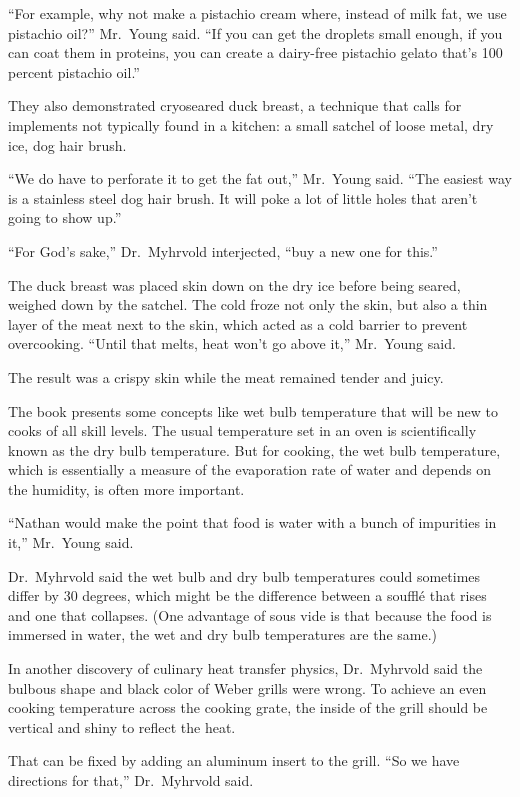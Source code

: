 ﻿\documentclass[12pt]{article}
\begin{document}
``For example, why not make a pistachio cream where, instead of milk fat, we use pistachio oil?''
Mr.~Young said. ``If you can get the droplets small enough, if you can coat them in proteins, you
can create a dairy-free pistachio gelato that's 100 percent pistachio oil.''

They also demonstrated cryoseared duck breast, a technique that calls for implements not typically
found in a kitchen: a small satchel of loose metal, dry ice, dog hair brush.

``We do have to perforate it to get the fat out,'' Mr.~Young said. ``The easiest way is a stainless
steel dog hair brush. It will poke a lot of little holes that aren't going to show up.''

``For God's sake,'' Dr.~Myhrvold interjected, ``buy a new one for this.''

The duck breast was placed skin down on the dry ice before being seared, weighed down by the
satchel. The cold froze not only the skin, but also a thin layer of the meat next to the skin, which
acted as a cold barrier to prevent overcooking. ``Until that melts, heat won't go above it,''
Mr.~Young said.

The result was a crispy skin while the meat remained tender and juicy.

The book presents some concepts like wet bulb temperature that will be new to cooks of all skill
levels. The usual temperature set in an oven is scientifically known as the dry bulb temperature.
But for cooking, the wet bulb temperature, which is essentially a measure of the evaporation rate of
water and depends on the humidity, is often more important.

``Nathan would make the point that food is water with a bunch of impurities in it,'' Mr.~Young said.

Dr.~Myhrvold said the wet bulb and dry bulb temperatures could sometimes differ by 30 degrees, which
might be the difference between a souffl\'e that rises and one that collapses. (One advantage of
sous vide is that because the food is immersed in water, the wet and dry bulb temperatures are the
same.)

In another discovery of culinary heat transfer physics, Dr.~Myhrvold said the bulbous shape and
black color of Weber grills were wrong. To achieve an even cooking temperature across the cooking
grate, the inside of the grill should be vertical and shiny to reflect the heat.

That can be fixed by adding an aluminum insert to the grill. ``So we have directions for that,''
Dr.~Myhrvold said.
\end{document}
